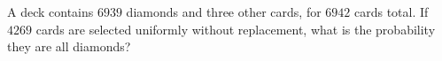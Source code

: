 A deck contains $6939$ diamonds and three other cards, for $6942$ cards total. If $4269$ cards are selected uniformly without replacement, what is the probability they are all diamonds?
